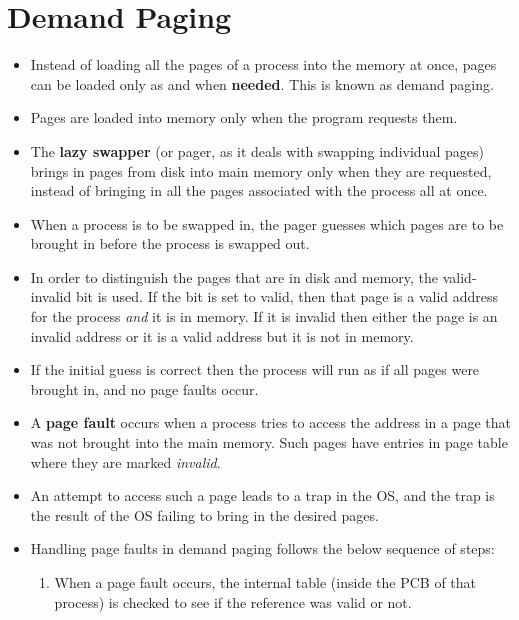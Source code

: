 \documentclass{article}
\theoremstyle{plain}
\theoremstyle{definition}
\begin{document}
\section{Demand Paging}
\begin{itemize}
    \item Instead of loading all the pages of a process into the memory at once, pages can be loaded only as and when \textbf{needed}. This is known as demand paging.
    
    \item Pages are loaded into memory only when the program requests them. 
    
    \item The \textbf{lazy swapper} (or pager, as it deals with swapping individual pages) brings in pages from disk into main memory only when they are requested, instead of bringing in all the pages associated with the process all at once.
    
    \item When a process is to be swapped in, the pager guesses which pages are to be brought in before the process is swapped out. 
    
    \item In order to distinguish the pages that are in disk and memory, the valid-invalid bit is used. If the bit is set to valid, then that page is a valid address for the process \textit{and} it is in memory. If it is invalid then either the page is an invalid address or it is a valid address but it is not in memory. 
    
    \item If the initial guess is correct then the process will run as if all pages were brought in, and no page faults occur.
    
    \item A \textbf{page fault} occurs when a process tries to access the address in a page that was not brought into the main memory. Such pages have entries in page table where they are marked \textit{invalid}. 
    
    \item An attempt to access such a page leads to a trap in the OS, and the trap is the result of the OS failing to bring in the desired pages. 
    
    \item Handling page faults in demand paging follows the below sequence of steps:
    \begin{enumerate}
        \item When a page fault occurs, the internal table (inside the PCB of that process) is checked to see if the reference was valid or not.
        

\end{enumerate}
\end{itemize}
\end{document}
